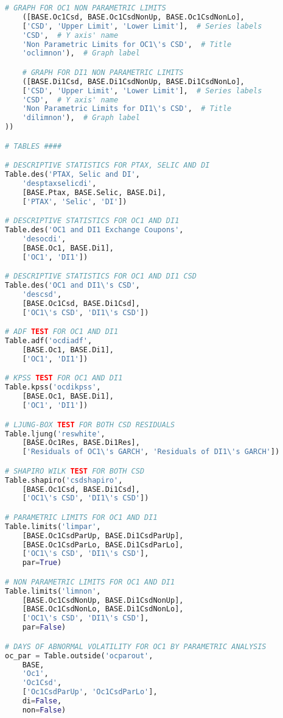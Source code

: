 \begin{lstlisting}[language=Python]
    # GRAPH FOR OC1 NON PARAMETRIC LIMITS
    ([BASE.Oc1Csd, BASE.Oc1CsdNonUp, BASE.Oc1CsdNonLo],
    ['CSD', 'Upper Limit', 'Lower Limit'],  # Series labels
    'CSD',  # Y axis' name
    'Non Parametric Limits for OC1\'s CSD',  # Title
    'oclimnon'),  # Graph label

    # GRAPH FOR DI1 NON PARAMETRIC LIMITS
    ([BASE.Di1Csd, BASE.Di1CsdNonUp, BASE.Di1CsdNonLo],
    ['CSD', 'Upper Limit', 'Lower Limit'],  # Series labels
    'CSD',  # Y axis' name
    'Non Parametric Limits for DI1\'s CSD',  # Title
    'dilimnon'),  # Graph label
))

# TABLES ####

# DESCRIPTIVE STATISTICS FOR PTAX, SELIC AND DI
Table.des('PTAX, Selic and DI',
    'desptaxselicdi',
    [BASE.Ptax, BASE.Selic, BASE.Di],
    ['PTAX', 'Selic', 'DI'])

# DESCRIPTIVE STATISTICS FOR OC1 AND DI1
Table.des('OC1 and DI1 Exchange Coupons',
    'desocdi',
    [BASE.Oc1, BASE.Di1],
    ['OC1', 'DI1'])

# DESCRIPTIVE STATISTICS FOR OC1 AND DI1 CSD
Table.des('OC1 and DI1\'s CSD',
    'descsd',
    [BASE.Oc1Csd, BASE.Di1Csd],
    ['OC1\'s CSD', 'DI1\'s CSD'])

# ADF TEST FOR OC1 AND DI1
Table.adf('ocdiadf',
    [BASE.Oc1, BASE.Di1],
    ['OC1', 'DI1'])

# KPSS TEST FOR OC1 AND DI1
Table.kpss('ocdikpss',
    [BASE.Oc1, BASE.Di1],
    ['OC1', 'DI1'])

# LJUNG-BOX TEST FOR BOTH CSD RESIDUALS
Table.ljung('reswhite',
    [BASE.Oc1Res, BASE.Di1Res],
    ['Residuals of OC1\'s GARCH', 'Residuals of DI1\'s GARCH'])

# SHAPIRO WILK TEST FOR BOTH CSD
Table.shapiro('csdshapiro',
    [BASE.Oc1Csd, BASE.Di1Csd],
    ['OC1\'s CSD', 'DI1\'s CSD'])

# PARAMETRIC LIMITS FOR OC1 AND DI1
Table.limits('limpar',
    [BASE.Oc1CsdParUp, BASE.Di1CsdParUp],
    [BASE.Oc1CsdParLo, BASE.Di1CsdParLo],
    ['OC1\'s CSD', 'DI1\'s CSD'],
    par=True)

# NON PARAMETRIC LIMITS FOR OC1 AND DI1
Table.limits('limnon',
    [BASE.Oc1CsdNonUp, BASE.Di1CsdNonUp],
    [BASE.Oc1CsdNonLo, BASE.Di1CsdNonLo],
    ['OC1\'s CSD', 'DI1\'s CSD'],
    par=False)

# DAYS OF ABNORMAL VOLATILITY FOR OC1 BY PARAMETRIC ANALYSIS
oc_par = Table.outside('ocparout',
    BASE,
    'Oc1',
    'Oc1Csd',
    ['Oc1CsdParUp', 'Oc1CsdParLo'],
    di=False,
    non=False)


\end{lstlisting}

